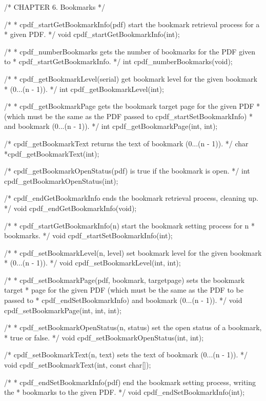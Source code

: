 /* CHAPTER 6. Bookmarks */

/*
 * cpdf_startGetBookmarkInfo(pdf) start the bookmark retrieval process for a
 * given PDF.
 */
void cpdf_startGetBookmarkInfo(int);

/*
 * cpdf_numberBookmarks gets the number of bookmarks for the PDF given to
 * cpdf_startGetBookmarkInfo.
 */
int cpdf_numberBookmarks(void);

/*
 * cpdf_getBookmarkLevel(serial) get bookmark level for the given bookmark
 * (0...(n - 1)).
 */
int cpdf_getBookmarkLevel(int);

/*
 * cpdf_getBookmarkPage gets the bookmark target page for the given PDF
 * (which must be the same as the PDF passed to cpdf_startSetBookmarkInfo)
 * and bookmark (0...(n - 1)).
 */
int cpdf_getBookmarkPage(int, int);

/* cpdf_getBookmarkText returns the text of bookmark (0...(n - 1)). */
char *cpdf_getBookmarkText(int);

/* cpdf_getBookmarkOpenStatus(pdf) is true if the bookmark is open. */
int cpdf_getBookmarkOpenStatus(int);

/* cpdf_endGetBookmarkInfo ends the bookmark retrieval process, cleaning up. */
void cpdf_endGetBookmarkInfo(void);

/*
 * cpdf_startGetBookmarkInfo(n) start the bookmark setting process for n
 * bookmarks.
 */
void cpdf_startSetBookmarkInfo(int);

/*
 * cpdf_setBookmarkLevel(n, level) set bookmark level for the given bookmark
 * (0...(n - 1)).
 */
void cpdf_setBookmarkLevel(int, int);

/*
 * cpdf_setBookmarkPage(pdf, bookmark, targetpage) sets the bookmark target
 * page for the given PDF (which must be the same as the PDF to be passed to
 * cpdf_endSetBookmarkInfo) and bookmark (0...(n - 1)).
 */
void cpdf_setBookmarkPage(int, int, int);

/*
 * cpdf_setBookmarkOpenStatus(n, status) set the open status of a bookmark,
 * true or false.
 */
void cpdf_setBookmarkOpenStatus(int, int);

/* cpdf_setBookmarkText(n, text) sets the text of bookmark (0...(n - 1)). */
void cpdf_setBookmarkText(int, const char[]);

/*
 * cpdf_endSetBookmarkInfo(pdf) end the bookmark setting process, writing the
 * bookmarks to the given PDF.
 */
void cpdf_endSetBookmarkInfo(int);

